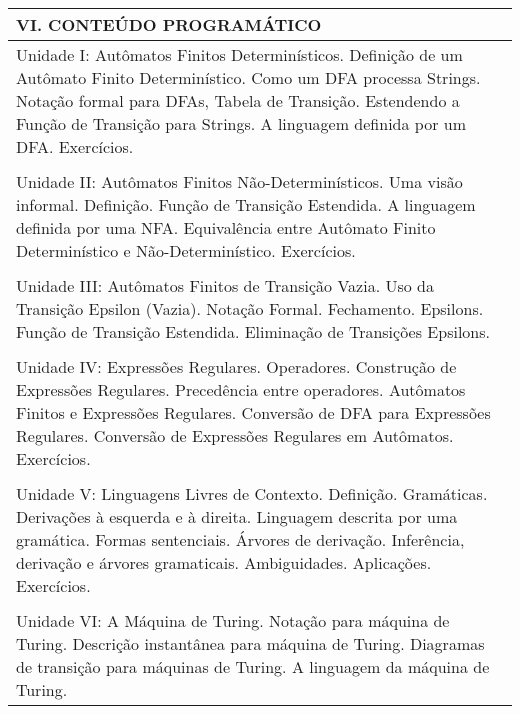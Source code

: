 \documentclass[12pt]{article}
\begin{document}
\begin{longtable}{|L{1.025\textwidth}|} \hline
%
{\bf VI. CONTEÚDO PROGRAMÁTICO } \\ \hline
Unidade I: Autômatos Finitos Determinísticos. Definição de um Autômato Finito Determinístico. Como um DFA processa Strings. Notação formal para DFAs, Tabela de Transição. Estendendo a Função de Transição para Strings. A linguagem definida por um DFA. Exercícios.\\
\\
Unidade II: Autômatos Finitos Não-Determinísticos. Uma visão informal. Definição. Função de Transição Estendida. A linguagem definida por uma NFA. Equivalência entre Autômato Finito Determinístico e Não-Determinístico. Exercícios.\\
\\
Unidade III: Autômatos Finitos de Transição Vazia. Uso da Transição Epsilon (Vazia). Notação Formal. Fechamento. Epsilons. Função de Transição Estendida. Eliminação de Transições Epsilons.\\
\\
Unidade IV: Expressões Regulares. Operadores. Construção de Expressões Regulares. Precedência entre operadores. Autômatos Finitos e Expressões Regulares. Conversão de DFA para Expressões Regulares. Conversão de Expressões Regulares em Autômatos. Exercícios.\\
\\
Unidade V: Linguagens Livres de Contexto. Definição. Gramáticas. Derivações à esquerda e à direita. Linguagem descrita por uma gramática. Formas sentenciais. Árvores de derivação. Inferência, derivação e árvores gramaticais. Ambiguidades. Aplicações. Exercícios.\\
\\
Unidade VI: A Máquina de Turing. Notação para máquina de Turing. Descrição instantânea para máquina de Turing. Diagramas de transição para máquinas de Turing. A linguagem da máquina de Turing.

\\ \hline
\end{longtable} 

\end{document}
